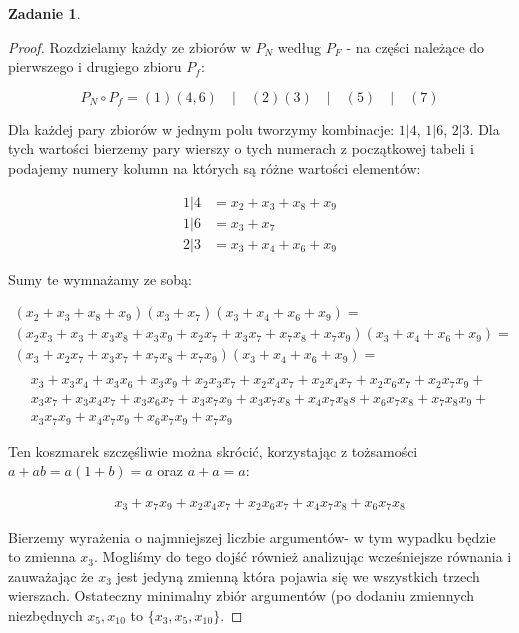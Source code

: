 \documentclass[11pt]{article}
\theoremstyle{definition}
\newtheorem{zadanie}{Zadanie}
\begin{document}
\begin{zadanie}
\begin{proof}
Rozdzielamy każdy ze zbiorów w $P_N$ według $P_F$ - na części należące do pierwszego i drugiego zbioru $P_f$:

$$P_N\circ P_f = (1)(4,6) \quad\big|\quad (2)(3) \quad\big|\quad (5)\quad \big|\quad (7)$$

Dla każdej pary zbiorów w jednym polu tworzymy kombinacje: $1|4$, $1|6$, $2|3$. Dla tych wartości bierzemy pary wierszy o tych numerach z początkowej tabeli i podajemy numery kolumn na których są różne wartości elementów:

\begin{align*}
1|4 &=x_2 + x_3+x_8+x_9\\
1|6 &=x_3+x_7\\
2|3 &=x_3+x_4+x_6+x_9
\end{align*}

Sumy te wymnażamy ze sobą:

\begin{align*}
(x_2 + x_3+x_8+x_9)(x_3+x_7)(x_3+x_4+x_6+x_9) = \\
(x_2x_3 + x_3 + x_3x_8+x_3x_9 + x_2x_7+x_3x_7+x_7x_8+x_7x_9)(x_3+x_4+x_6+x_9) = \\
(x_3 + x_2x_7+x_3x_7+x_7x_8+x_7x_9)(x_3+x_4+x_6+x_9) =\\
\end{align*}
\begin{align*}
x_3+x_3x_4+x_3x_6+x_3x_9 + x_2x_3x_7 +x_2x_4x_7+x_2x_4x_7+x_2x_6x_7+x_2x_7x_9 + \\
x_3x_7+x_3x_4x_7+x_3x_6x_7+x_3x_7x_9+x_3x_7x_8+x_4x_7x_8s+x_6x_7x_8+x_7x_8x_9+\\
x_3x_7x_9+x_4x_7x_9+x_6x_7x_9+x_7x_9
\end{align*}

Ten koszmarek szczęśliwie można skrócić, korzystając z tożsamości $a + ab = a(1+b) = a$ oraz $a+a = a$:

\begin{align*}
x_3+x_7x_9+x_2x_4x_7+x_2x_6x_7+x_4x_7x_8+x_6x_7x_8
\end{align*}

Bierzemy wyrażenia o najmniejszej liczbie argumentów-  w tym wypadku będzie to zmienna $x_3$. Mogliśmy do tego dojść również analizując wcześniejsze równania i zauważając że $x_3$ jest jedyną zmienną która pojawia się we wszystkich trzech wierszach. Ostateczny minimalny zbiór argumentów (po dodaniu zmiennych niezbędnych $x_5, x_{10}$ to $\{x_3, x_5, x_{10}\}$.


\end{proof}

\end{zadanie}
\end{document}
